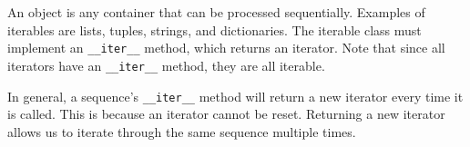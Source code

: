 An  object is any container that can be processed sequentially.
Examples of iterables are lists, tuples, strings, and dictionaries. The iterable
class must implement an \lstinline$__iter__$ method, which returns an iterator.
Note that since all iterators have an \lstinline$__iter__$ method, they are all
iterable.

In general, a sequence's \lstinline$__iter__$ method will return a new iterator
every time it is called. This is because an iterator cannot be reset. Returning
a new iterator allows us to iterate through the same sequence multiple times.
